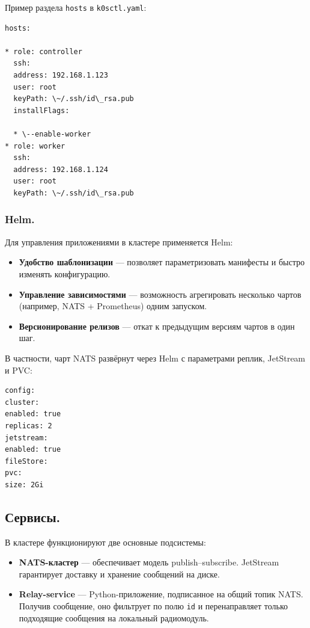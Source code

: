 \documentclass[14pt, a4paper]{extreport}
\begin{document}
Пример раздела \texttt{hosts} в \texttt{k0sctl.yaml}:

\begin{verbatim}
hosts:

* role: controller
  ssh:
  address: 192.168.1.123
  user: root
  keyPath: \~/.ssh/id\_rsa.pub
  installFlags:

  * \--enable-worker
* role: worker
  ssh:
  address: 192.168.1.124
  user: root
  keyPath: \~/.ssh/id\_rsa.pub
  \end{verbatim}

\subsubsection{Helm.}

Для управления приложениями в кластере применяется Helm:
\begin{itemize}
\item \textbf{Удобство шаблонизации} — позволяет параметризовать манифесты и быстро изменять конфигурацию.
\item \textbf{Управление зависимостями} — возможность агрегировать несколько чартов (например, NATS + Prometheus) одним запуском.
\item \textbf{Версионирование релизов} — откат к предыдущим версиям чартов в один шаг.
\end{itemize}

В частности, чарт NATS развёрнут через Helm с параметрами реплик, JetStream и PVC:

\begin{verbatim}
config:
cluster:
enabled: true
replicas: 2
jetstream:
enabled: true
fileStore:
pvc:
size: 2Gi
\end{verbatim}

\subsection{Сервисы.}

В кластере функционируют две основные подсистемы:

\begin{itemize}
\item \textbf{NATS-кластер} — обеспечивает модель publish–subscribe. JetStream гарантирует доставку и хранение сообщений на диске.
\item \textbf{Relay-service} — Python-приложение, подписанное на общий топик NATS. Получив сообщение, оно фильтрует по полю \texttt{id} и перенаправляет только подходящие сообщения на локальный радиомодуль.
\end{itemize}
\end{document}
